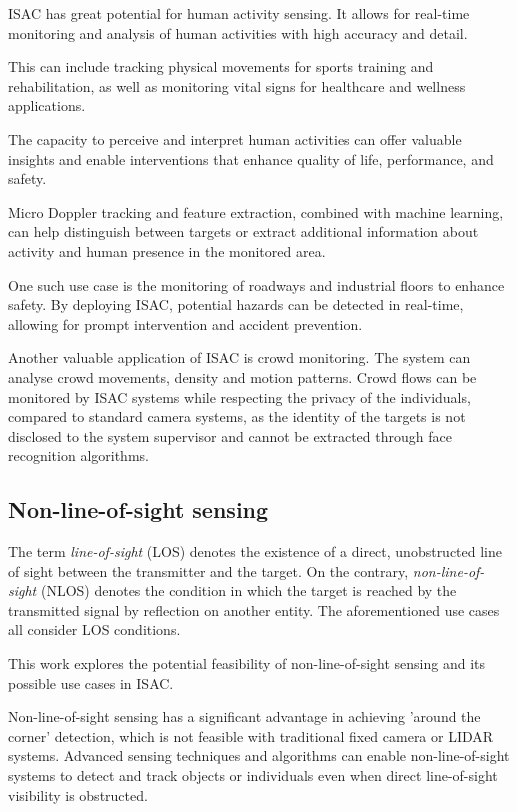 	ISAC has great potential for human activity sensing. It allows for real-time monitoring and analysis of human activities with high accuracy and detail. 
	
	This can include tracking physical movements for sports training and rehabilitation, as well as monitoring vital signs for healthcare and wellness applications. 
	
	The capacity to perceive and interpret human activities can offer valuable insights and enable interventions that enhance quality of life, performance, and safety.
	
	Micro Doppler tracking and feature extraction, combined with machine learning, can help distinguish between targets or extract additional information about activity and human presence in the monitored area.
	
	One such use case is the monitoring of roadways and industrial floors to enhance safety. By deploying ISAC, potential hazards can be detected in real-time, allowing for prompt intervention and accident prevention. 
	
	Another valuable application of ISAC is crowd monitoring. 
	The system can analyse crowd movements, density and motion patterns. 
	Crowd flows can be monitored by ISAC systems while respecting the privacy of the individuals, compared to standard camera systems, as the identity of the targets is not disclosed to the system supervisor and cannot be extracted through face recognition algorithms.

	
	\subsection{Non-line-of-sight sensing}
	
	The term \textit{line-of-sight} (LOS)  denotes the existence of a direct, unobstructed line of sight between the transmitter and the target. On the contrary, \textit{non-line-of-sight} (NLOS) denotes the condition in which the target is reached by the transmitted signal by reflection on another entity. The aforementioned use cases all consider LOS conditions. 
	
	This work explores the potential feasibility of non-line-of-sight sensing and its possible use cases in ISAC.
	
	Non-line-of-sight sensing has a significant advantage in achieving 'around the corner' detection, which is not feasible with traditional fixed camera or LIDAR systems. Advanced sensing techniques and algorithms can enable non-line-of-sight systems to detect and track objects or individuals even when direct line-of-sight visibility is obstructed.
	
